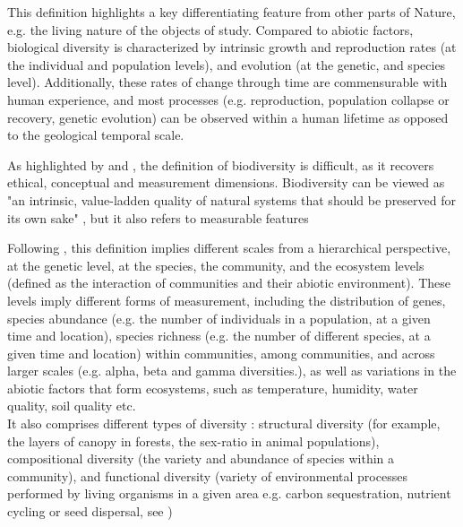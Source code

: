 This definition highlights a key differentiating feature from other parts of Nature, e.g. the living nature of the objects of study. Compared to abiotic factors, biological diversity is characterized by intrinsic growth and reproduction rates (at the individual and population levels), and evolution (at the genetic, and species level). Additionally, these rates of change through time are commensurable with human experience, and most processes (e.g. reproduction, population collapse or recovery, genetic evolution) can be observed within a human lifetime as opposed to the geological temporal scale. 

As highlighted by \cite{mouysset_diversity_2023} and \cite{VanDyke2008}, the definition of biodiversity is difficult, as it recovers ethical, conceptual and measurement dimensions. Biodiversity can be viewed as "an intrinsic, value-ladden quality of natural systems that should be preserved for its own sake" \citep{VanDyke2008, mouysset_diversity_2023}, but it also refers to measurable features

Following \cite{mouysset_diversity_2023}, this definition implies different scales from a hierarchical perspective, at the genetic level, at the species, the community, and the ecosystem levels (defined as the interaction of communities and their abiotic environment). These levels imply different forms of measurement, including the distribution of genes, species abundance (e.g. the number of individuals in a population, at a given time and location), species richness (e.g. the number of different species, at a given time and location) within communities, among communities, and across larger scales (e.g. alpha, beta and gamma diversities.), as well as variations in the abiotic factors that form ecosystems, such as temperature, humidity, water quality, soil quality etc. 
\\
It also comprises different types of diversity : structural diversity (for example, the layers of canopy in forests, the sex-ratio in animal populations), compositional diversity (the variety and abundance of species within a community), and functional diversity (variety of environmental processes performed by living organisms in a given area e.g. carbon sequestration, nutrient cycling or seed dispersal, see \cite{loreau_biodiversity_2002})

